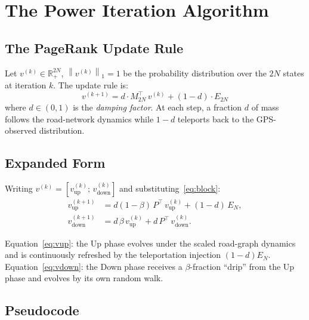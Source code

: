 \documentclass[12pt,a4paper]{article}
\theoremstyle{definition}
\theoremstyle{plain}
\newcommand{\vup}{v_{\mathrm{up}}}
\newcommand{\vdown}{v_{\mathrm{down}}}
\newcommand{\norm}[1]{\left\|#1\right\|}
\begin{document}
\section{The Power Iteration Algorithm}
\label{sec:poweriter}

\subsection{The PageRank Update Rule}

Let $v^{(k)} \in \mathbb{R}^{2N}_+$, $\norm{v^{(k)}}_1 = 1$ be the probability
distribution over the $2N$ states at iteration $k$. The update rule is:
\begin{equation}
  \boxed{v^{(k+1)} = d \cdot M_{2N}^\top\, v^{(k)} + (1-d) \cdot E_{2N}}
  \label{eq:pagerank}
\end{equation}
where $d \in (0,1)$ is the \emph{damping factor}. At each step, a fraction $d$ of mass
follows the road-network dynamics while $1-d$ teleports back to the GPS-observed
distribution.

\subsection{Expanded Form}

Writing $v^{(k)} = [\vup^{(k)};\,\vdown^{(k)}]$ and substituting~\eqref{eq:block}:
\begin{align}
  \vup^{(k+1)} &= d(1-\beta)\,P^\top\,\vup^{(k)} + (1-d)\,E_N,
  \label{eq:vup}\\
  \vdown^{(k+1)} &= d\,\beta\,\vup^{(k)} + d\,P^\top\,\vdown^{(k)}.
  \label{eq:vdown}
\end{align}

Equation~\eqref{eq:vup}: the Up phase evolves under the scaled road-graph dynamics and
is continuously refreshed by the teleportation injection $(1-d)E_N$.
Equation~\eqref{eq:vdown}: the Down phase receives a $\beta$-fraction ``drip'' from the
Up phase and evolves by its own random walk.

\subsection{Pseudocode}
\end{document}
